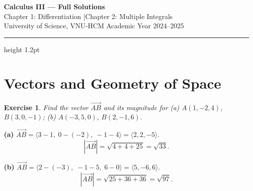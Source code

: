 \documentclass[12pt,a4paper]{article}
\theoremstyle{exstyle}
\newtheorem{exercise}{Exercise}[section]
\begin{document}
\begin{center}
  {\LARGE\bfseries\color{primary} Calculus III --- Full Solutions}\\[4pt]
  {\large\color{secondary}
   Chapter 1: Differentiation \quad|\quad Chapter 2: Multiple Integrals}\\[4pt]
  {\normalsize University of Science, VNU-HCM
   \hfill Academic Year 2024--2025}
\end{center}
\vspace{-4pt}\hrule height 1.2pt\vspace{10pt}

\tableofcontents
\newpage

\section{Vectors and Geometry of Space}

\begin{exercise}
Find the vector $\overrightarrow{AB}$ and its magnitude for (a) $A(1,-2,4)$, $B(3,0,-1)$;
(b) $A(-3,5,0)$, $B(2,-1,6)$.
\end{exercise}
\begin{solbox}
\textbf{(a)} $\overrightarrow{AB}=\langle 3-1,\;0-(-2),\;-1-4\rangle=\langle 2,2,-5\rangle$.
\[
  |\overrightarrow{AB}|=\sqrt{4+4+25}=\sqrt{33}.
\]

\textbf{(b)} $\overrightarrow{AB}=\langle 2-(-3),\;-1-5,\;6-0\rangle=\langle 5,-6,6\rangle$.
\[
  |\overrightarrow{AB}|=\sqrt{25+36+36}=\sqrt{97}.
\]
\end{solbox}
\end{document}
